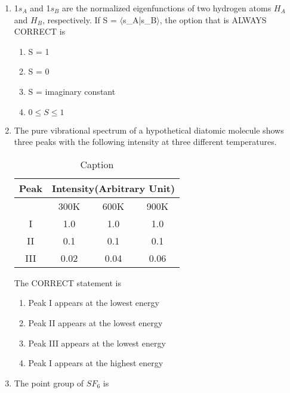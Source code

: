 \documentclass[12pt]{article}
\begin{document}
\begin{enumerate}
\item 1$s_A$ and 1$s_B$ are the normalized eigenfunctions of two hydrogen atoms $H_A $ and $H_B$,
respectively. If S = $\langle  $s_{A}$ $|$ $s_{B}$ \rangle$, the option that is ALWAYS CORRECT is

\begin{enumerate}
    \item S = 1
    \item S = 0
    \item S = imaginary constant
    \item $0 \leq S \leq 1$
\end{enumerate}


\item The pure vibrational spectrum of a hypothetical diatomic molecule shows three
peaks with the following intensity at three different temperatures.


\begin{table}[H]
    \centering
    \begin{tabular}{|c|c|c|c|}
    \hline
         Peak&  \multicolumn{3}{c|}{Intensity(Arbitrary Unit)}\\ \hline
         &  300K&  600K& 900K\\ \hline
         I&  1.0&  1.0& 1.0\\ \hline
         II&  0.1&  0.1& 0.1\\ \hline
         III&  0.02&  0.04& 0.06\\ \hline
    \end{tabular}
    \caption{Caption}
    \label{tab:placeholder}
\end{table}


The CORRECT statement is

\begin{enumerate}
    \item Peak I appears at the lowest energy
    \item Peak II appears at the lowest energy
    \item Peak III appears at the lowest energy
    \item Peak I appears at the highest energy
\end{enumerate}

\item The point group of $SF_6$ is

\begin{enumerate} 
\end{enumerate}




\end{enumerate}
\end{document}
